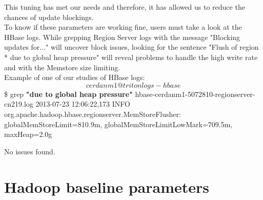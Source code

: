 \begin{enumerate}
This tuning has met our needs and therefore, it has allowed us to reduce the chances of update blockings.
\\
To know if these parameters are working fine, users must take a look at the HBase logs. While grepping Region Server logs with the message "Blocking updates for..." will uncover block issues, looking for the sentence "Flush of region * due to global heap pressure" will reveal problems to handle the high write rate and with the Memstore size limiting. 
\\
Example of one of our studies of HBase logs:
\[cerdanm1@triton logs-hbase\]\$ grep \textbf{"due to global heap pressure"} hbase-cerdanm1-5072810-regionserver-cn219.log 
2013-07-23 12:06:22,173 INFO org.apache.hadoop.hbase.regionserver.MemStoreFlusher: globalMemStoreLimit=810.9m, globalMemStoreLimitLowMark=709.5m, maxHeap=2.0g

No issues found.


\end{enumerate}


\section{Hadoop baseline parameters}

